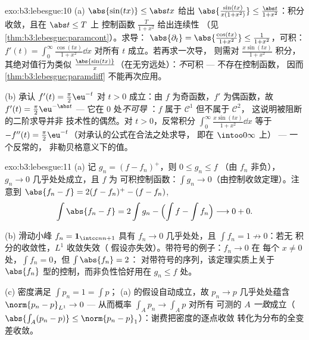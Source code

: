 \begin{solution}{exo:b3:lebesgue:10}
(a) $\abs{\sin(tx)} \leq \abs tx$ 给出
$\abs{\frac{\sin(tx)}{x(1+x^2)}} \leq \frac{\abs
t}{1+x^2}$：积分收敛，且在 $\abs t \leq T$ 上
控制函数 $\frac{T}{1+x^2}$ 给出连续性
（见\cref{thm:b3:lebesgue:paramcont}）。求导：
$\abs{\partial_t} = \abs{\frac{\cos(tx)}{1+x^2}} \leq
\frac1{1+x^2}$，可积：$f'(t) =
\int_0^\infty\frac{\cos(tx)}{1+x^2}\dd x$ 对所有 $t$ 成立。若再求一次导，
则需对 $\frac{x\sin(tx)}{1 +
x^2}$ 积分，其绝对值行为类似 $\frac{\abs{\sin(tx)}}
x$（在无穷远处）：\emph{不}可积 --- 不存在控制函数，
因而 \cref{thm:b3:lebesgue:paramdiff} 不能再次应用。

(b) 承认 $f'(t) = \frac\pi2\eu^{-t}$ 对 $t > 0$ 成立：由
$f$ 为奇函数，$f'$ 为偶函数，故 $f'(t) =
\frac\pi2\eu^{-\abs t}$ --- 它在 $0$ 处\emph{不可导
}：$f$ 属于 $\mathcal C^1$ 但不属于 $\mathcal C^2$，
这说明被阻断的二阶求导并非
技术性的偶然。对 $t > 0$，反常积分
$\int_0^\infty\frac{x\sin(tx)}{1+x^2}\dd x$ 等于 $-f''(t) =
\frac\pi2\eu^{-t}$（对承认的公式在合法之处求导，
即在 $\intoo0\infty$ 上） --- 一个反常的，
非勒贝格意义下的值。
\end{solution}

\begin{solution}{exo:b3:lebesgue:11}
(a) 记 $g_n = (f - f_n)^+$，则 $0 \leq g_n \leq f$
（由 $f_n$ 非负），$g_n \to 0$ 几乎处处成立，且 $f$ 为
可积控制函数：$\int g_n \to 0$（由控制收敛定理）。注意到
$\abs{f_n - f} = 2(f - f_n)^+ - (f - f_n)$,
\[
\int\abs{f_n - f} = 2\int g_n - \Bigl(\int f - \int
f_n\Bigr) \longrightarrow 0 + 0 .
\]

(b) 滑动小峰 $f_n = \mathbf 1_{\intcc n{n+1}}$ 具有
$f_n \to 0$ 几乎处处，且 $\int f_n = 1 \not\to 0$：若无
积分的收敛性，$L^1$ 收敛失效（
假设亦失效）。带符号的例子：$f_n \to 0$ 在
每个 $x \neq 0$ 处，$\int f_n = 0$，但 $\int\abs{f_n} = 2$：
对带符号的序列，该定理实质上关于
$\abs{f_n}$ 型的控制，而非负性恰好用在
$g_n \leq f$ 处。

(c) 密度满足 $\int p_n = 1 = \int p$；
(a) 的假设自动成立，故 $p_n \to p$ 几乎处处蕴含
$\norm{p_n - p}_{L^1} \to 0$ --- 从而概率
$\int_Ap_n \to \int_Ap$ 对所有
可测的 $A$ \emph{一致}成立（$\abs{\int_A(p_n - p)} \leq
\norm{p_n - p}_1$）：谢费把密度的逐点收敛
转化为分布的全变差收敛。
\end{solution}

